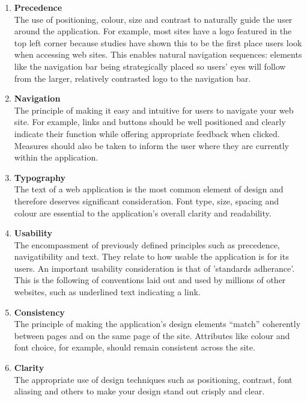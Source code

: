 \documentclass{l3proj}
\begin{document}
\begin{enumerate} 

\item{\textbf{Precedence}} \\
The use of positioning, colour, size and contrast to naturally guide the user around the application. For example, most sites have a logo featured in the top left corner because studies have shown this to be the first place users look when accessing web sites. This enables natural navigation sequences: elements like the navigation bar being strategically placed so users' eyes will follow from the larger, relatively contrasted logo to the navigation bar.

\item{\textbf{Navigation}} \\
The principle of making it easy and intuitive for users to navigate your web site. For example, links and buttons should be well positioned and clearly indicate their function while offering appropriate feedback when clicked. Measures should also be taken to inform the user where they are currently within the application.

\item{\textbf{Typography}} \\
The text of a web application is the most common element of design and therefore deserves significant consideration. Font type, size, spacing and colour are essential to the application's overall clarity and readability.

\item{\textbf{Usability}} \\
The encompassment of previously defined principles such as precedence, navigatibility and text. They relate to how usable the application is for its users. An important usability consideration is that of 'standards adherance'. This is the following of conventions laid out and used by millions of other websites, such as underlined text indicating a link.

\item{\textbf{Consistency}} \\
The principle of making the application's design elements ``match'' coherently between pages and on the same page of the site. Attributes like colour and font choice, for example, should remain consistent across the site.

\item{\textbf{Clarity}} \\
The appropriate use of design techniques such as positioning, contrast, font aliasing and others to make your design stand out crisply and clear. 
\end{enumerate}
	
\end{document}
